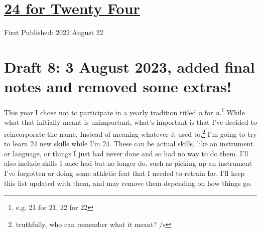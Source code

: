 \documentclass[12pt]{article}[titlepage]
\newcommand{\1}{\={a}}
\newcommand{\2}{\={e}}
\newcommand{\3}{\={\i}}
\newcommand{\4}{\=o}
\newcommand{\5}{\=u}
\newcommand{\6}{\={A}}
\renewcommand{\,}{\textsuperscript{,}}
\begin{document}
\doublespacing
\section{\href{twenty-four-html}{24 for Twenty Four}}
First Published: 2022 August 22


\section{Draft 8: 3 August 2023, added final notes and removed some extras!}
This year I chose not to participate in a yearly tradition titled \textit{n} for \textit{n}.\footnote{e.g. 21 for 21, 22 for 22}
While what that initially meant is unimportant, what's important is that I've decided to reincorporate the name.
Instead of meaning whatever it used to,\footnote{truthfully, who can remember what it meant? /s} I'm going to try to learn 24 new skills while I'm 24.
These can be actual skills, like an instrument or language, or things I just had never done and so had no way to do them.
I'll also include skills I once had but no longer do, such as picking up an instrument I've forgotten or doing some athletic feat that I needed to retrain for.
I'll keep this list updated with them, and may remove them depending on how things go.
\end{document}
